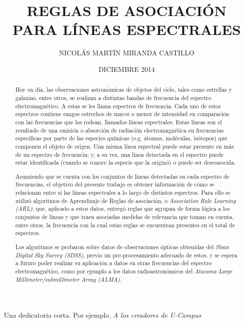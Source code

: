 \documentclass[upright, contnum]{umemoria}
\author{NICOL\'AS MART\'IN MIRANDA CASTILLO}
\title{REGLAS DE ASOCIACI\'ON PARA L\'INEAS ESPECTRALES}
\date{DICIEMBRE 2014}
\begin{document}
\frontmatter
\maketitle

\begin{abstract}
Hoy en día, las observaciones astronómicas de objetos del cielo, tales como estrellas y galaxias, entre otros, se realizan a distintas bandas de frecuencia del espectro electromagnético. A estas se les llama espectros de frecuencia. Cada uno de estos espectros contiene rangos estrechos de mayor o menor de intensidad en comparación con las frecuencias que los rodean, llamados líneas espectrales. Estas líneas son el resultado de una emisión o absorción de radiación electromagnética en frecuencias específicas por parte de las especies químicas (e.g. átomos, moléculas, isótopos) que componen el objeto de origen. Una misma línea espectral puede estar presente en más de un espectro de frecuencia; y, a su vez, una línea detectada en el espectro puede estar identificada (cuando se conoce la especie que la originó) o puede ser desconocida.

Asumiendo que se cuenta con los conjuntos de líneas detectadas en cada espectro de frecuencias, el objetivo del presente trabajo es obtener información de cómo se relacionan entre sí las líneas espectrales a lo largo de distintos espectros. Para ello se utilizó algoritmos de Aprendizaje de Reglas de asociación, o \textit{Association Rule Learning (ARL)}; que, aplicado a estos datos, entregó reglas que agrupan de forma lógica a los conjuntos de líneas y que traen asociadas medidas de relevancia que toman en cuenta, entre otros, la frecuencia con la cual estas reglas se encuentran presentes en el total de espectros.

Los algoritmos se probaron sobre datos de observaciones ópticas obtenidas del \textit{Sloan Digital Sky Survey (SDSS)}, previo un pre-procesamiento adecuado de estos, y se espera a futuro poder realizar su aplicación a datos en otras frecuencias del espectro electromagnético, como por ejemplo a los datos radioastronómicos del \textit{Atacama Large Millimeter/submillimeter Array (ALMA)}.
\end{abstract}

\begin{dedicatoria}
Una dedicatoria corta. Por ejemplo, \emph{A los creadores de U-Campus}
\end{dedicatoria}

\begin{thanks}
\lipsum[1-2]
\end{thanks}

\cleardoublepage
\begin{spacing}{1}
\tableofcontents
\listoffigures
\end{spacing}

\mainmatter








\nocite{*}


\end{document}
